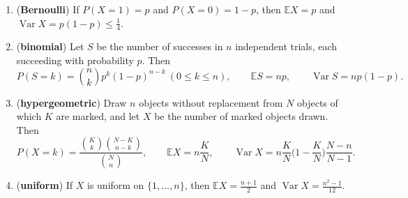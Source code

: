 \begin{proposition}\label{prop:laws}
\begin{enumerate}[label=(\alph*)]
\item (\textbf{Bernoulli}) If $P(X=1)=p$ and $P(X=0)=1-p$, then $\mathbb E X=p$ and $\operatorname{Var}X=p(1-p)\le\frac14$.
\item (\textbf{binomial}) Let $S$ be the number of successes in $n$ independent trials, each succeeding with probability $p$. Then
\[
P(S=k)=\binom nkp^k(1-p)^{n-k}\ (0\le k\le n),\qquad\mathbb E S=np,\qquad\operatorname{Var}S=np(1-p).
\]
\item (\textbf{hypergeometric}) Draw $n$ objects without replacement from $N$ objects of which $K$ are marked, and let $X$ be the number of marked objects drawn. Then
\[
P(X=k)=\frac{\binom Kk\binom{N-K}{n-k}}{\binom Nn},\qquad\mathbb E X=n\frac KN,\qquad\operatorname{Var}X=n\frac KN\Big(1-\frac KN\Big)\frac{N-n}{N-1}.
\]
\item (\textbf{uniform}) If $X$ is uniform on $\{1,\dots,n\}$, then $\mathbb EX=\frac{n+1}2$ and $\operatorname{Var}X=\frac{n^2-1}{12}$.
\end{enumerate}
\end{proposition}
